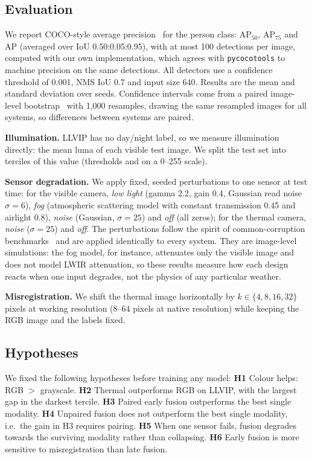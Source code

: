 \documentclass[conference]{IEEEtran}
\begin{document}
\subsection{Evaluation}
We report COCO-style average precision~\cite{lin2014coco} for the person class: AP$_{50}$, AP$_{75}$ and AP (averaged over IoU 0.50:0.05:0.95), with at most 100 detections per image, computed with our own implementation, which agrees with \texttt{pycocotools} to machine precision on the same detections. All detectors use a confidence threshold of 0.001, NMS IoU 0.7 and input size 640. Results are the mean and standard deviation over seeds. Confidence intervals come from a paired image-level bootstrap~\cite{efron1994bootstrap} with 1{,}000 resamples, drawing the same resampled images for all systems, so differences between systems are paired.

\textbf{Illumination.} LLVIP has no day/night label, so we measure illumination directly: the mean luma of each visible test image. We split the test set into terciles of this value (thresholds \LumLo{} and \LumHi{} on a 0--255 scale).

\textbf{Sensor degradation.} We apply fixed, seeded perturbations to one sensor at test time: for the visible camera, \emph{low light} (gamma 2.2, gain 0.4, Gaussian read noise $\sigma{=}6$), \emph{fog} (atmospheric scattering model with constant transmission 0.45 and airlight 0.8), \emph{noise} (Gaussian, $\sigma{=}25$) and \emph{off} (all zeros); for the thermal camera, \emph{noise} ($\sigma{=}25$) and \emph{off}. The perturbations follow the spirit of common-corruption benchmarks~\cite{hendrycks2019corruptions} and are applied identically to every system. They are image-level simulations: the fog model, for instance, attenuates only the visible image and does not model LWIR attenuation, so these results measure how each design reacts when one input degrades, not the physics of any particular weather.

\textbf{Misregistration.} We shift the thermal image horizontally by $k\in\{4,8,16,32\}$ pixels at working resolution ($8$--$64$ pixels at native resolution) while keeping the RGB image and the labels fixed.

\subsection{Hypotheses}\label{sec:hyp}
We fixed the following hypotheses before training any model:
\textbf{H1} Colour helps: RGB $>$ grayscale.
\textbf{H2} Thermal outperforms RGB on LLVIP, with the largest gap in the darkest tercile.
\textbf{H3} Paired early fusion outperforms the best single modality.
\textbf{H4} Unpaired fusion does not outperform the best single modality, i.e.\ the gain in H3 requires pairing.
\textbf{H5} When one sensor fails, fusion degrades towards the surviving modality rather than collapsing.
\textbf{H6} Early fusion is more sensitive to misregistration than late fusion.
\end{document}
